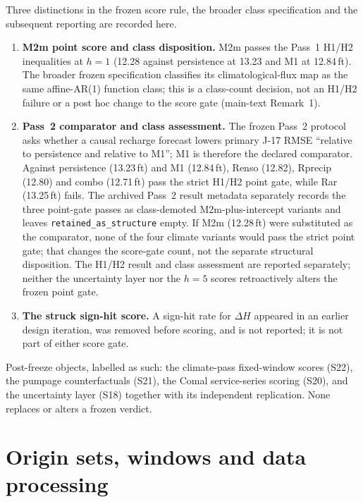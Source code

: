 \documentclass[preprint,11pt,authoryear]{elsarticle}
\theoremstyle{remark}
\begin{document}
Three distinctions in the frozen score rule, the broader class specification and the subsequent reporting are recorded here.
\begin{enumerate}[leftmargin=2em]
\item \textbf{M2m point score and class disposition.} M2m passes the Pass~1 H1/H2 inequalities at $h=1$ (12.28 against persistence at 13.23 and M1 at 12.84\,ft). The broader frozen specification classifies its climatological-flux map as the same affine-AR(1) function class; this is a class-count decision, not an H1/H2 failure or a post hoc change to the score gate (main-text Remark~1).
\item \textbf{Pass~2 comparator and class assessment.} The frozen Pass~2 protocol asks whether a causal recharge forecast lowers primary J-17 RMSE ``relative to persistence and relative to M1''; M1 is therefore the declared comparator. Against persistence (13.23\,ft) and M1 (12.84\,ft), Renso (12.82), Rprecip (12.80) and combo (12.71\,ft) pass the strict H1/H2 point gate, while Rar (13.25\,ft) fails. The archived Pass~2 result metadata separately records the three point-gate passes as class-demoted M2m-plus-intercept variants and leaves \texttt{retained\_as\_structure} empty. If M2m (12.28\,ft) were substituted as the comparator, none of the four climate variants would pass the strict point gate; that changes the score-gate count, not the separate structural disposition. The H1/H2 result and class assessment are reported separately; neither the uncertainty layer nor the $h=5$ scores retroactively alters the frozen point gate.
\item \textbf{The struck sign-hit score.} A sign-hit rate for $\Delta H$ appeared in an earlier design iteration, was removed before scoring, and is not reported; it is not part of either score gate.
\end{enumerate}

Post-freeze objects, labelled as such: the climate-pass fixed-window scores (S22), the pumpage counterfactuals (S21), the Comal service-series scoring (S20), and the uncertainty layer (S18) together with its independent replication. None replaces or alters a frozen verdict.

\section{Origin sets, windows and data processing}\label{si:edworigins}
\end{document}
